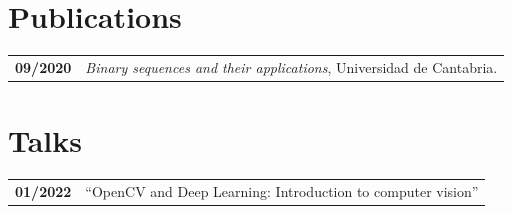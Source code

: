 \documentclass[grey]{hipstercv}
\begin{document}
\begin{paracol}{2}
\begin{minipage}[t]{0.3\textwidth}
\section*{Publications}
\begin{tabular}{>{\footnotesize\bfseries}r >{\footnotesize}p{}}
    09/2020 & \emph{Binary sequences and their applications}, Universidad de Cantabria.
\end{tabular}
\section*{Talks}
\begin{tabular}{>{\footnotesize\bfseries}r >{\footnotesize}p{}}
    01/2022 & ``OpenCV and Deep Learning: Introduction to computer vision''
\end{tabular}
\end{minipage}


\end{paracol}
\end{document}
